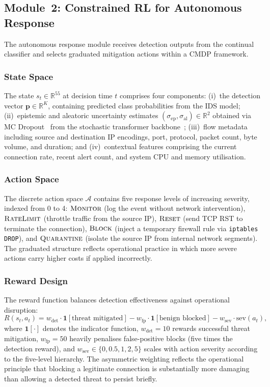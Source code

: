 \documentclass[journal]{IEEEtran}
\theoremstyle{definition}
\theoremstyle{remark}
\newcommand{\real}{\mathbb{R}}
\begin{document}
\subsection{Module~2: Constrained RL for Autonomous Response}
\label{subsec:rl_method}

The autonomous response module receives detection outputs from the continual classifier and selects graduated mitigation actions within a CMDP framework.

\subsubsection{State Space}
The state $s_t \in \real^{55}$ at decision time $t$ comprises four components: (i)~the detection vector $\mathbf{p} \in \real^{K}$, containing predicted class probabilities from the IDS model; (ii)~epistemic and aleatoric uncertainty estimates $(\sigma_{\mathrm{ep}}, \sigma_{\mathrm{al}}) \in \real^2$ obtained via MC Dropout~\cite{gal2016dropout} from the stochastic transformer backbone~\cite{anaedevha2026stochastic}; (iii)~flow metadata including source and destination IP encodings, port, protocol, packet count, byte volume, and duration; and (iv)~contextual features comprising the current connection rate, recent alert count, and system CPU and memory utilisation.

\subsubsection{Action Space}
The discrete action space $\mathcal{A}$ contains five response levels of increasing severity, indexed from 0 to 4: $\textsc{Monitor}$ (log the event without network intervention), $\textsc{RateLimit}$ (throttle traffic from the source IP), $\textsc{Reset}$ (send TCP RST to terminate the connection), $\textsc{Block}$ (inject a temporary firewall rule via \texttt{iptables DROP}), and $\textsc{Quarantine}$ (isolate the source IP from internal network segments). The graduated structure reflects operational practice in which more severe actions carry higher costs if applied incorrectly.

\subsubsection{Reward Design}
The reward function balances detection effectiveness against operational disruption:
\begin{equation}
\label{eq:reward}
R(s_t, a_t) = w_{\mathrm{det}}\cdot\mathbf{1}[\text{threat mitigated}] - w_{\mathrm{fp}}\cdot\mathbf{1}[\text{benign blocked}] - w_{\mathrm{sev}}\cdot\mathrm{sev}(a_t),
\end{equation}
where $\mathbf{1}[\cdot]$ denotes the indicator function, $w_{\mathrm{det}} = 10$ rewards successful threat mitigation, $w_{\mathrm{fp}} = 50$ heavily penalises false-positive blocks (five times the detection reward), and $w_{\mathrm{sev}} \in \{0, 0.5, 1, 2, 5\}$ scales with action severity according to the five-level hierarchy. The asymmetric weighting reflects the operational principle that blocking a legitimate connection is substantially more damaging than allowing a detected threat to persist briefly.
\end{document}
